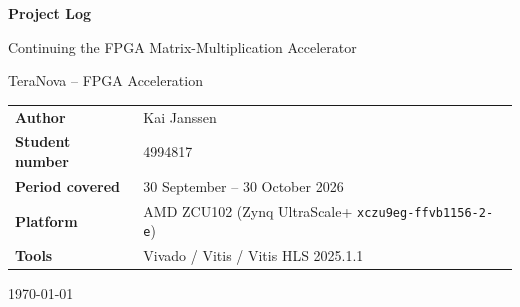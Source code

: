 \documentclass[11pt,a4paper]{article}
\newcommand{\code}[1]{\texttt{#1}}
\begin{document}
\begin{titlepage}
\centering
\vspace*{3cm}
{\LARGE\bfseries Project Log\par}
\vspace{0.5cm}
{\Large Continuing the FPGA Matrix-Multiplication Accelerator\par}
\vspace{0.3cm}
{\large TeraNova -- FPGA Acceleration\par}
\vspace{2cm}
\begin{tabular}{@{}ll@{}}
\textbf{Author}          & Kai Janssen \\
\textbf{Student number}  & 4994817 \\
\textbf{Period covered}  & 30 September -- 30 October 2026 \\
\textbf{Platform}        & AMD ZCU102 (Zynq UltraScale+ \code{xczu9eg-ffvb1156-2-e}) \\
\textbf{Tools}           & Vivado / Vitis / Vitis HLS 2025.1.1 \\
\end{tabular}
\vfill
{\large \today\par}
\end{titlepage}

\tableofcontents
\newpage

\end{document}
